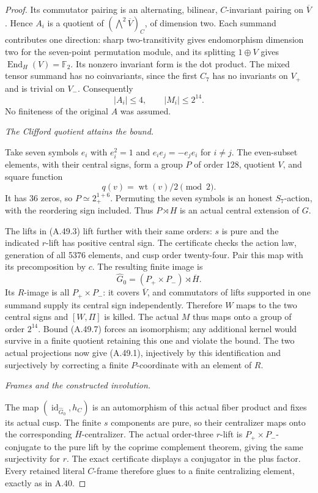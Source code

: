 \begin{proof}
Its commutator pairing is an alternating,
bilinear, \(C\)-invariant pairing on
\(\overline V\). Hence \(A_i\) is a quotient
of \((\bigwedge^2\overline V)_C\), of
dimension two. Each summand contributes one
direction: sharp two-transitivity gives
endomorphism dimension two for the seven-point
permutation module, and its splitting
\(1\oplus V\) gives
\(\operatorname{End}_H(V)=\mathbb F_2\).
Its nonzero invariant form is the dot product.
The mixed tensor summand has no coinvariants,
since the first \(C_7\) has no invariants on
\(V_+\) and is trivial on \(V_-\).
Consequently
\[
                          |A_i|\leq4,
 \qquad |M_i|\leq2^{14}.
 \tag{A.49.7}
\]
No finiteness of the original \(A\) was assumed.

\emph{The Clifford quotient attains the bound.}\par
Take seven symbols \(e_i\) with \(e_i^2=1\)
and \(e_ie_j=-e_je_i\) for \(i\ne j\).
The even-subset elements, with their central
signs, form a group \(P\) of order 128,
quotient \(V\), and square function
\[
                         q(v)=\operatorname{wt}(v)/2\pmod2.
\]
It has 36 zeros, so \(P\simeq2_+^{1+6}\).
Permuting the seven symbols is an honest
\(S_7\)-action, with the reordering sign included.
Thus \(P\rtimes H\) is an actual central
extension of \(G\).

The lifts in (A.49.3) lift further with their
same orders: \(s\) is pure and the indicated
\(r\)-lift has positive central sign. The
certificate 
checks the action law, generation of all
5376 elements, and cusp order twenty-four.
Pair this map with its precomposition by \(c\).
The resulting finite image is
\[
                     \widehat G_0=(P_+\times P_-)
                                           \rtimes\overline H.
\]
Its \(R\)-image is all \(P_+\times P_-\):
it covers \(\overline V\), and commutators
of lifts supported in one summand supply
its central sign independently. Therefore
\(W\) maps to the two central signs and
\([W,\Pi]\) is killed. The actual \(M\)
thus maps onto a group of order \(2^{14}\).
Bound (A.49.7) forces an isomorphism; any
additional kernel would survive in a finite
quotient retaining this one and violate the
bound. The two actual projections now give
(A.49.1), injectively by this identification
and surjectively by correcting a finite
\(P\)-coordinate with an element of \(R\).

\emph{Frames and the constructed involution.}\par
The map \((\operatorname{id}_{\widehat G_0},h_C)\)
is an automorphism of this actual fiber product
and fixes its actual cusp. The finite \(s\)
components are pure, so their centralizer maps
onto the corresponding \(\overline H\)-centralizer.
The actual order-three \(r\)-lift is
\(P_+\times P_-\)-conjugate to the pure lift
by the coprime complement theorem, giving
the same surjectivity for \(r\). The exact
certificate displays a conjugator in the
plus factor. Every retained literal
\(C\)-frame therefore glues to a finite
centralizing element, exactly as in A.40.


\end{proof}
